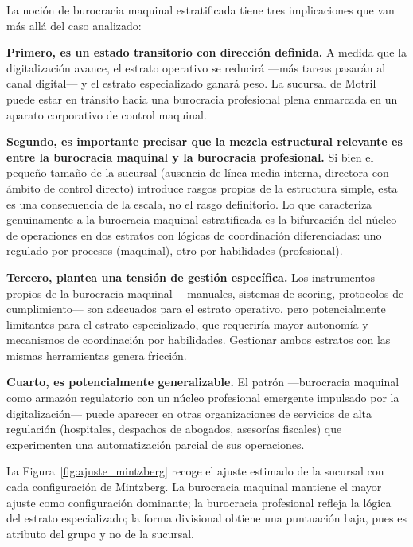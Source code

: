 La noción de burocracia maquinal estratificada tiene tres implicaciones que van más
allá del caso analizado:

\textbf{Primero, es un estado transitorio con dirección definida.} A medida que la
digitalización avance, el estrato operativo se reducirá ---más tareas pasarán al
canal digital--- y el estrato especializado ganará peso. La sucursal de Motril puede
estar en tránsito hacia una burocracia profesional plena enmarcada en un aparato
corporativo de control maquinal.

\textbf{Segundo, es importante precisar que la mezcla estructural relevante es entre
la burocracia maquinal y la burocracia profesional.} Si bien el pequeño tamaño de
la sucursal (ausencia de línea media interna, directora con ámbito de control
directo) introduce rasgos propios de la estructura simple, esta es una consecuencia
de la escala, no el rasgo definitorio. Lo que caracteriza genuinamente a la
burocracia maquinal estratificada es la bifurcación del núcleo de operaciones en
dos estratos con lógicas de coordinación diferenciadas: uno regulado por procesos
(maquinal), otro por habilidades (profesional).

\textbf{Tercero, plantea una tensión de gestión específica.} Los instrumentos propios
de la burocracia maquinal ---manuales, sistemas de scoring, protocolos de cumplimiento---
son adecuados para el estrato operativo, pero potencialmente limitantes para el estrato
especializado, que requeriría mayor autonomía y mecanismos de coordinación por
habilidades. Gestionar ambos estratos con las mismas herramientas genera fricción.

\textbf{Cuarto, es potencialmente generalizable.} El patrón ---burocracia maquinal
como armazón regulatorio con un núcleo profesional emergente impulsado por la
digitalización--- puede aparecer en otras organizaciones de servicios de alta regulación
(hospitales, despachos de abogados, asesorías fiscales) que experimenten una
automatización parcial de sus operaciones.

La Figura~\ref{fig:ajuste_mintzberg} recoge el ajuste estimado de la sucursal con cada
configuración de Mintzberg. La burocracia maquinal mantiene el mayor ajuste como
configuración dominante; la burocracia profesional refleja la lógica del estrato
especializado; la forma divisional obtiene una puntuación baja, pues es atributo
del grupo y no de la sucursal.

